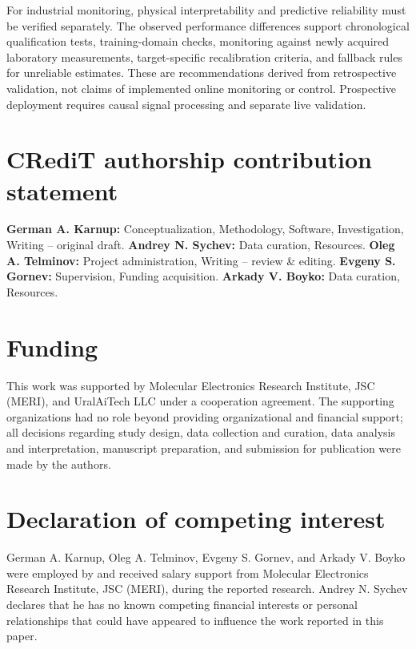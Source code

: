 \documentclass[preprint,12pt,authoryear]{elsarticle}
\begin{document}
For industrial monitoring, physical interpretability and predictive reliability must be verified separately. The observed performance differences support chronological qualification tests, training-domain checks, monitoring against newly acquired laboratory measurements, target-specific recalibration criteria, and fallback rules for unreliable estimates. These are recommendations derived from retrospective validation, not claims of implemented online monitoring or control. Prospective deployment requires causal signal processing and separate live validation.

\section*{CRediT authorship contribution statement}

\textbf{German A. Karnup:} Conceptualization, Methodology, Software, Investigation, Writing -- original draft. 
\textbf{Andrey N. Sychev:} Data curation, Resources. 
\textbf{Oleg A. Telminov:} Project administration, Writing -- review \& editing. 
\textbf{Evgeny S. Gornev:} Supervision, Funding acquisition. 
\textbf{Arkady V. Boyko:} Data curation, Resources.

\section*{Funding}

This work was supported by Molecular Electronics Research Institute, JSC (MERI), and UralAiTech LLC under a cooperation agreement. The supporting organizations had no role beyond providing organizational and financial support; all decisions regarding study design, data collection and curation, data analysis and interpretation, manuscript preparation, and submission for publication were made by the authors.

\section*{Declaration of competing interest}

German A. Karnup, Oleg A. Telminov, Evgeny S. Gornev, and Arkady V. Boyko were employed by and received salary support from Molecular Electronics Research Institute, JSC (MERI), during the reported research. Andrey N. Sychev declares that he has no known competing financial interests or personal relationships that could have appeared to influence the work reported in this paper.
\end{document}
